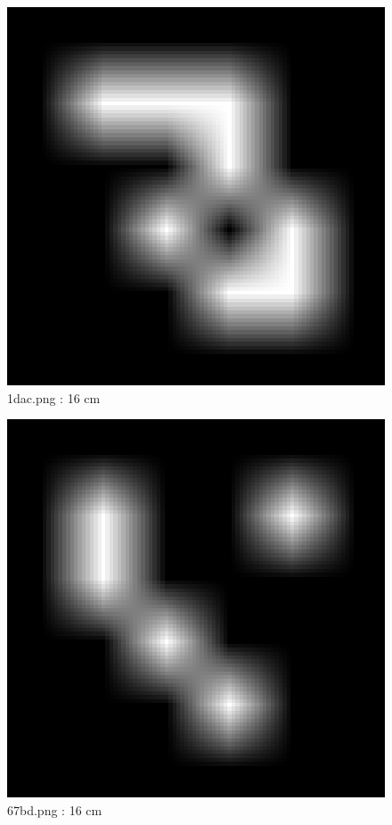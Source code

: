 \documentclass[11pt,a4,BCOR=0cm]{scrartcl}
\begin{document}
\newpage
\begin{figure}
  \begin{center}
    \includegraphics[natwidth=6,natheight=6,width=16cm]{1dac.png}
    \caption{1dac.png : 16 cm}
    \label{fig:1dac.png}
  \end{center}
\end{figure}
\newpage
\begin{figure}
  \begin{center}
    \includegraphics[natwidth=6,natheight=6,width=16cm]{67bd.png}
    \caption{67bd.png : 16 cm}
    \label{fig:67bd.png}
  \end{center}
\end{figure}
\end{document}
